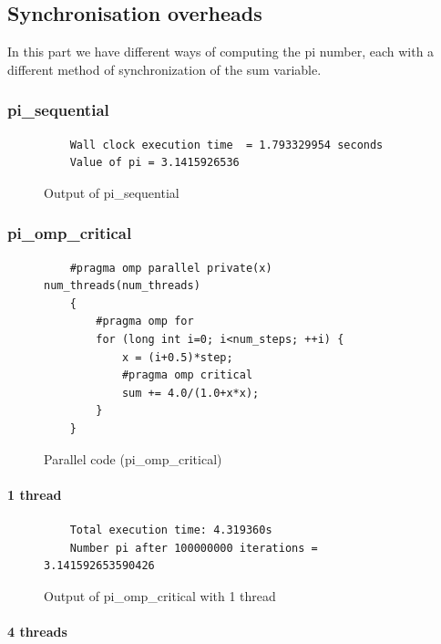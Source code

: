 \documentclass[12pt, a4paper]{article}
\begin{document}
\subsection{Synchronisation overheads}

In this part we have different ways of computing the pi number, each with a different method of synchronization of the sum variable.

\subsubsection{pi\_sequential}

\begin{figure}[H]
	\begin{lstlisting}
	Wall clock execution time  = 1.793329954 seconds
	Value of pi = 3.1415926536		
	\end{lstlisting}
	\caption{Output of pi\_sequential}
\end{figure}

\subsubsection{pi\_omp\_critical}

\begin{figure}[H]
	\begin{lstlisting}
	#pragma omp parallel private(x) num_threads(num_threads)
    {
        #pragma omp for 
        for (long int i=0; i<num_steps; ++i) {
            x = (i+0.5)*step;
            #pragma omp critical 
	    	sum += 4.0/(1.0+x*x);
        }
    }
	\end{lstlisting}
	
	\caption{Parallel code (pi\_omp\_critical)}
\end{figure}

\paragraph{1 thread}

\begin{figure}[H]
	\begin{lstlisting}
	Total execution time: 4.319360s
	Number pi after 100000000 iterations = 3.141592653590426		
	\end{lstlisting}
	\caption{Output of pi\_omp\_critical with 1 thread}
\end{figure}

\paragraph{4 threads}
\end{document}
